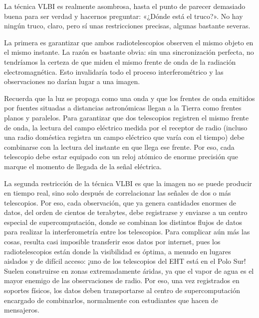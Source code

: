 La técnica VLBI es realmente asombrosa, hasta el punto de parecer demasiado buena para ser verdad y hacernos preguntar: «¿Dónde está el truco?». No hay ningún truco, claro, pero sí unas restricciones precisas, algunas bastante severas.

La primera es garantizar que ambos radiotelescopios observen el mismo objeto en el mismo instante. La razón es bastante obvia: sin una sincronización perfecta, no tendríamos la certeza de que miden el mismo frente de onda de la radiación electromagnética. Esto invalidaría todo el proceso interferométrico y las observaciones no darían lugar a una imagen.

Recuerda que la luz se propaga como una onda y que los frentes de onda emitidos por fuentes situadas a distancias astronómicas llegan a la Tierra como frentes planos y paralelos. Para garantizar que dos telescopios registren el mismo frente de onda, la lectura del campo eléctrico medida por el receptor de radio (incluso una radio doméstica registra un campo eléctrico que varía con el tiempo) debe combinarse con la lectura del instante en que llega ese frente. Por eso, cada telescopio debe estar equipado con un reloj atómico de enorme precisión que marque el momento de llegada de la señal eléctrica.

La segunda restricción de la técnica VLBI es que la imagen no se puede producir en tiempo real, sino solo después de correlacionar las señales de dos o más telescopios. Por eso, cada observación, que ya genera cantidades enormes de datos, del orden de cientos de terabytes, debe registrarse y enviarse a un centro especial de supercomputación, donde se combinan los distintos flujos de datos para realizar la interferometría entre los telescopios. Para complicar aún más las cosas, resulta casi imposible transferir esos datos por internet, pues los radiotelescopios están donde la visibilidad es óptima, a menudo en lugares aislados y de difícil acceso: ¡uno de los telescopios del EHT está en el Polo Sur! Suelen construirse en zonas extremadamente áridas, ya que el vapor de agua es el mayor enemigo de las observaciones de radio. Por eso, una vez registrados en soportes físicos, los datos deben transportarse al centro de supercomputación encargado de combinarlos, normalmente con estudiantes que hacen de mensajeros.


